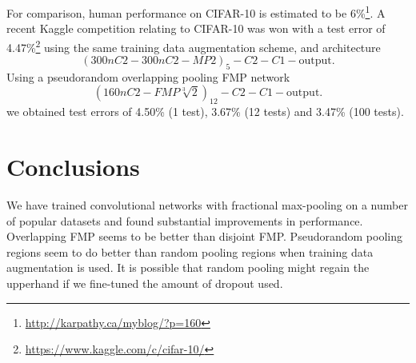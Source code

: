 \documentclass[english]{article}
\begin{document}
For comparison, human performance on
CIFAR-10 is estimated to be 6\%\footnote{\url{http://karpathy.ca/myblog/?p=160}}.
A recent Kaggle competition relating to CIFAR-10 was won with a test
error of 4.47\%\footnote{\url{https://www.kaggle.com/c/cifar-10/}} using the same training data augmentation scheme, and architecture
\[
(300nC2-300nC2-MP2)_5-C2-C1-\mathrm{output}.
\]
Using a pseudorandom overlapping pooling FMP network
\[
(160nC2-FMP\sqrt[3]{2})_{12}-C2-C1-\mathrm{output}.
\]
we obtained test errors of
4.50\% (1 test), 3.67\% (12 tests) and 3.47\% (100 tests).



\section{Conclusions}

We have trained convolutional networks with fractional max-pooling
on a number of popular datasets and found substantial improvements
in performance. Overlapping FMP seems to be better than disjoint FMP.
Pseudorandom pooling regions seem to do better than random pooling
regions when training data augmentation is used. It is possible that random pooling might
regain the upperhand if we fine-tuned the amount of dropout used.
\end{document}
